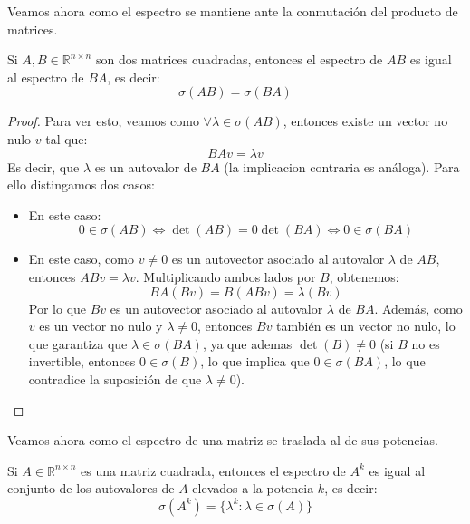 Veamos ahora como el espectro se mantiene ante la conmutación del producto de matrices.

\begin{proposición}
    Si $ A, B \in \mathbb{R}^{n \times n} $ son dos matrices cuadradas, entonces el espectro de $ AB $ es igual al espectro de $ BA $, es decir:
    \[
        \sigma(AB) = \sigma(BA)
    \]
\end{proposición}

\begin{proof}
    Para ver esto, veamos como $ \forall \lambda \in \sigma(AB) $, entonces existe un vector no nulo $ v $ tal que:
    \[
        BAv = \lambda v
    \]
    Es decir, que $ \lambda $ es un autovalor de $ BA $ (la implicacion contraria es análoga). Para ello distingamos dos casos:
    \begin{itemize}
        \item[$\lambda = 0$] En este caso:
        \[
            0 \in \sigma(AB) \iff
            \det(AB) = 0 \det(BA) \iff 
            0 \in \sigma(BA)
        \]
        \item[$\lambda \neq 0$] En este caso, como $ v \neq 0 $ es un autovector asociado al autovalor $ \lambda $ de $ AB $, entonces $ ABv = \lambda v $. Multiplicando ambos lados por $ B $, obtenemos:
        \[
            BA(Bv) =
            B(ABv) = 
            \lambda (Bv)
        \]
        Por lo que $ Bv $ es un autovector asociado al autovalor $ \lambda $ de $ BA $. Además, como $ v $ es un vector no nulo y $ \lambda \neq 0 $, entonces $ Bv $ también es un vector no nulo, lo que garantiza que $ \lambda \in \sigma(BA) $, ya que ademas $\det(B) \neq 0$ (si $B$ no es invertible, entonces $0 \in \sigma(B)$, lo que implica que $0 \in \sigma(BA)$, lo que contradice la suposición de que $\lambda \neq 0$).
    \end{itemize}
\end{proof}

Veamos ahora como el espectro de una matriz se traslada al de sus potencias.

\begin{proposición}
    Si $ A \in \mathbb{R}^{n \times n} $ es una matriz cuadrada, entonces el espectro de $ A^k $ es igual al conjunto de los autovalores de $ A $ elevados a la potencia $ k $, es decir:
    \[
        \sigma(A^k) = \{ \lambda^k : \lambda \in \sigma(A) \}
    \]
\end{proposición}

